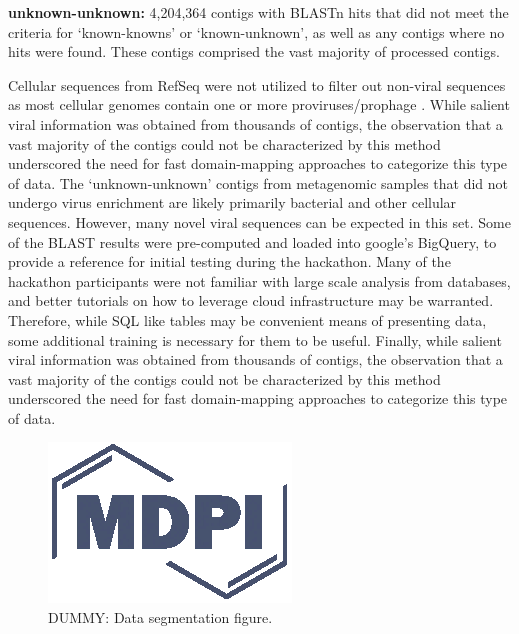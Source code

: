     \textbf{unknown-unknown:} 4,204,364 contigs with BLASTn hits that did not
    meet the criteria for ‘known-knowns’ or ‘known-unknown’, as well as any
    contigs where no hits were found. These contigs comprised the vast majority
    of processed contigs.

  Cellular sequences from RefSeq were not utilized to filter out non-viral
  sequences as most cellular genomes contain one or more proviruses/prophage
  \cite{Roux2015a,Liu2011b}. While salient viral information was obtained from
  thousands of contigs, the observation that a vast majority of the contigs
  could not be characterized by this method underscored the need for fast
  domain-mapping approaches to categorize this type of data. The
  ‘unknown-unknown’ contigs from metagenomic samples that did not undergo virus
  enrichment are likely primarily bacterial and other cellular sequences.
  However, many novel viral sequences can be expected in this set. Some of the
  BLAST results were pre-computed and loaded into google's BigQuery, to provide
  a reference for initial testing during the hackathon. Many of the hackathon
  participants were not familiar with large scale analysis from databases, and
  better tutorials on how to leverage cloud infrastructure may be warranted.
  Therefore, while SQL like tables may be convenient means of presenting data,
  some additional training is necessary for them to be useful. Finally, while
  salient viral information was obtained from thousands of contigs, the
  observation that a vast majority of the contigs could not be characterized by
  this method underscored the need for fast domain-mapping approaches to
  categorize this type of data.


  \begin{figure}[h]
    \centering
    \includegraphics{Definitions/logo-mdpi}
    \caption{DUMMY: Data segmentation figure.
            \label{fig:data_segmentation}}
  \end{figure}

